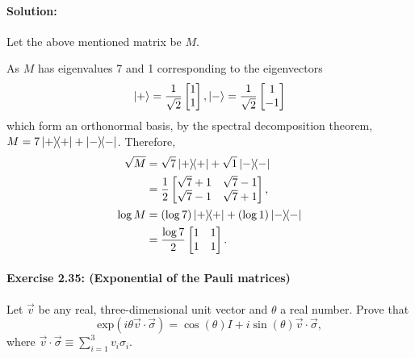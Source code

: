 \documentclass{article}
\begin{document}
\paragraph{Solution:} Let the above mentioned matrix be $M$.

As $M$ has eigenvalues 7 and 1 corresponding to the eigenvectors
\begin{equation*}
  \ket{+} = \frac{1}{\sqrt{2}}\begin{bmatrix}1 \\ 1\end{bmatrix},
  \ket{-} = \frac{1}{\sqrt{2}}\begin{bmatrix}1 \\ -1\end{bmatrix}
\end{equation*} which form an orthonormal basis, by the spectral decomposition
theorem, $M = 7\ketbra{+}{+} + \ketbra{-}{-}$. Therefore, \begin{align*}
  \sqrt{M} &= \sqrt{7}\ketbra{+}{+} + \sqrt{1}\ketbra{-}{-} \\
    &= \frac{1}{2}\begin{bmatrix}
      \sqrt{7} + 1 & \sqrt{7} - 1 \\
      \sqrt{7} - 1 & \sqrt{7} + 1
    \end{bmatrix}, \\
  \log{M} &= (\log{7})\ketbra{+}{+} + (\log{1})\ketbra{-}{-} \\
    &= \frac{\log{7}}{2}\begin{bmatrix}
      1 & 1 \\
      1 & 1
    \end{bmatrix}.
\end{align*}

\paragraph{\cite{mikeandike} Exercise 2.35: (Exponential of the Pauli matrices)
} Let $\vec{v}$ be any real, three-dimensional unit vector and $\theta$ a real
number. Prove that \begin{equation*}
  \mathrm{exp}(i \theta \vec{v} \cdot \vec{\sigma}) = \cos(\theta)I + i
    \sin(\theta)\vec{v} \cdot \vec{\sigma},
\end{equation*} where $\vec{v} \cdot \vec{\sigma} \equiv \sum_{i=1}^3 v_i
\sigma_i$.
\end{document}
